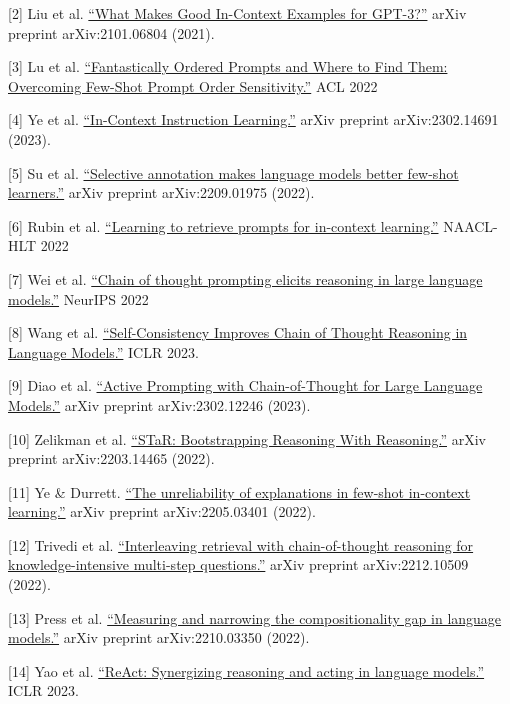 {[}2{]} Liu et al. \href{https://arxiv.org/abs/2101.06804}{``What Makes Good In-Context Examples for GPT-3?''} arXiv preprint arXiv:2101.06804 (2021).

{[}3{]} Lu et al. \href{https://arxiv.org/abs/2104.08786}{``Fantastically Ordered Prompts and Where to Find Them: Overcoming Few-Shot Prompt Order Sensitivity.''} ACL 2022

{[}4{]} Ye et al. \href{https://arxiv.org/abs/2302.14691}{``In-Context Instruction Learning.''} arXiv preprint arXiv:2302.14691 (2023).

{[}5{]} Su et al. \href{https://arxiv.org/abs/2209.01975}{``Selective annotation makes language models better few-shot learners.''} arXiv preprint arXiv:2209.01975 (2022).

{[}6{]} Rubin et al. \href{https://arxiv.org/abs/2112.08633}{``Learning to retrieve prompts for in-context learning.''} NAACL-HLT 2022

{[}7{]} Wei et al. \href{https://arxiv.org/abs/2201.11903}{``Chain of thought prompting elicits reasoning in large language models.''} NeurIPS 2022

{[}8{]} Wang et al. \href{https://arxiv.org/abs/2203.11171}{``Self-Consistency Improves Chain of Thought Reasoning in Language Models.''} ICLR 2023.

{[}9{]} Diao et al. \href{https://arxiv.org/abs/2302.12246}{``Active Prompting with Chain-of-Thought for Large Language Models.''} arXiv preprint arXiv:2302.12246 (2023).

{[}10{]} Zelikman et al. \href{https://arxiv.org/abs/2203.14465}{``STaR: Bootstrapping Reasoning With Reasoning.''} arXiv preprint arXiv:2203.14465 (2022).

{[}11{]} Ye \& Durrett. \href{https://arxiv.org/abs/2205.03401}{``The unreliability of explanations in few-shot in-context learning.''} arXiv preprint arXiv:2205.03401 (2022).

{[}12{]} Trivedi et al. \href{https://arxiv.org/abs/2212.10509}{``Interleaving retrieval with chain-of-thought reasoning for knowledge-intensive multi-step questions.''} arXiv preprint arXiv:2212.10509 (2022).

{[}13{]} Press et al. \href{https://arxiv.org/abs/2210.03350}{``Measuring and narrowing the compositionality gap in language models.''} arXiv preprint arXiv:2210.03350 (2022).

{[}14{]} Yao et al. \href{https://arxiv.org/abs/2210.03629}{``ReAct: Synergizing reasoning and acting in language models.''} ICLR 2023.

